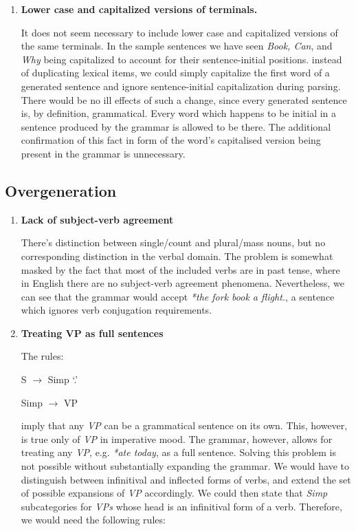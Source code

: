 \documentclass{article}
\begin{document}
\begin{description}
\begin{enumerate}
\begin{center}
		\end{center}
		
		\item
		\textbf{Lower case and capitalized versions of terminals.}
		
		It does not seem necessary to include lower case and capitalized versions of the same terminals. In the sample sentences we have seen \textit{Book, Can}, and \textit{Why} being capitalized to account for their sentence-initial positions. instead of duplicating lexical items, we could simply capitalize  the first word of a generated sentence and ignore sentence-initial capitalization during parsing.
		There would be no ill effects of such a change, since every generated sentence is, by definition, grammatical. Every word which happens to be initial in a sentence produced by the grammar is allowed to be there. The additional confirmation of this fact in form of the word's capitalised version being present in the grammar is unnecessary.
	\end{enumerate}
	\subsection{Overgeneration}
	\begin{enumerate}
		\item
		\textbf{Lack of subject-verb agreement}
		
		There’s distinction between single/count and plural/mass nouns, but no corresponding distinction in the verbal domain. The problem is somewhat masked by the fact that most of the included verbs are in past tense, where in English there are no subject-verb agreement phenomena. Nevertheless, we can see that the grammar would accept  \emph{*the fork book a flight.}, a sentence which ignores verb conjugation requirements.
		
		\item
		\textbf{Treating VP as full sentences}
		
		The rules:
		\begin{center}
			
			S $\rightarrow$ Simp ‘.’
			
			Simp $\rightarrow$ VP
			
		\end{center}
		imply that any \emph{VP} can be a grammatical sentence on its own. This, however, is true only of \emph{VP} in imperative mood. The grammar, however, allows for treating any \emph{VP}, e.g. \emph{*ate today}, as a full sentence. Solving this problem is not possible without substantially expanding the grammar. We would have to distinguish between infinitival and inflected forms of verbs, and extend the set of possible expansions of \emph{VP} accordingly. We could then state that \emph{Simp} subcategories for \emph{VPs} whose head is an infinitival form of a verb. Therefore, we would need the following rules:
		\begin{center}
			

\end{center}
\end{enumerate}
\end{description}
\end{document}
